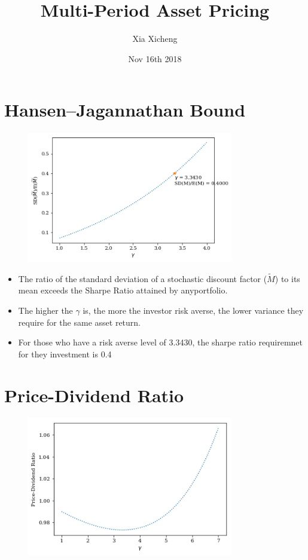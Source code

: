\documentclass{article}
\title{Multi-Period Asset Pricing}
\date{Nov 16th 2018}
\author{Xia Xicheng}
\begin{document}
	\maketitle

\section{Hansen–Jagannathan Bound}
\begin{figure}[h]
	\centering
	\includegraphics[width=9cm]{output_4_0.png}
\end{figure}

\begin{itemize}
	\item The ratio of the standard deviation of a stochastic discount factor ($\tilde{M}$) to its mean exceeds the Sharpe Ratio attained by anyportfolio.
	
	\item The higher the $\gamma$ is, the more the investor risk averse, the lower variance they require for the same asset return.
	
	\item For those who have a risk averse level of 3.3430, the sharpe ratio requiremnet for they investment is 0.4 
\end{itemize}

\section{Price-Dividend Ratio}
\begin{figure}[h]
	\centering
	\includegraphics[width=9cm]{output_6_0.png}
\end{figure}
\newpage
\end{document}

